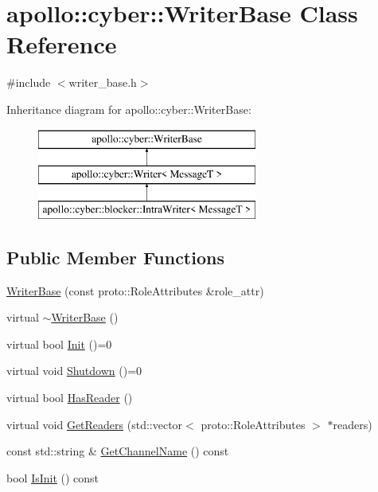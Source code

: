 \hypertarget{classapollo_1_1cyber_1_1WriterBase}{\section{apollo\-:\-:cyber\-:\-:Writer\-Base Class Reference}
\label{classapollo_1_1cyber_1_1WriterBase}
}


{\ttfamily \#include $<$writer\-\_\-base.\-h$>$}

Inheritance diagram for apollo\-:\-:cyber\-:\-:Writer\-Base\-:\begin{figure}[H]
\begin{center}
\leavevmode
\includegraphics[height=3.000000cm]{classapollo_1_1cyber_1_1WriterBase}
\end{center}
\end{figure}
\subsection*{Public Member Functions}
\begin{DoxyCompactItemize}
\item 
\hyperlink{classapollo_1_1cyber_1_1WriterBase_a1c04642de705c6bee86124f18728a4b9}{Writer\-Base} (const proto\-::\-Role\-Attributes \&role\-\_\-attr)
\item 
virtual \hyperlink{classapollo_1_1cyber_1_1WriterBase_a151a9f6d1429e02d236fd400ef935846}{$\sim$\-Writer\-Base} ()
\item 
virtual bool \hyperlink{classapollo_1_1cyber_1_1WriterBase_acff05a3215b2a2da4b2a140069ac001d}{Init} ()=0
\item 
virtual void \hyperlink{classapollo_1_1cyber_1_1WriterBase_ad2f187881a2832ece860eb11d69acc8b}{Shutdown} ()=0
\item 
virtual bool \hyperlink{classapollo_1_1cyber_1_1WriterBase_a2c158df45980927544cff2c55214c31a}{Has\-Reader} ()
\item 
virtual void \hyperlink{classapollo_1_1cyber_1_1WriterBase_a93845a2774b7515bf63d432ffbed5fda}{Get\-Readers} (std\-::vector$<$ proto\-::\-Role\-Attributes $>$ $\ast$readers)
\item 
const std\-::string \& \hyperlink{classapollo_1_1cyber_1_1WriterBase_a899ae473e501c2230dc1e4f1cf7f265c}{Get\-Channel\-Name} () const 
\item 
bool \hyperlink{classapollo_1_1cyber_1_1WriterBase_a76acead79b6c85ed9450ba0cdaed7d42}{Is\-Init} () const 
\end{DoxyCompactItemize}
